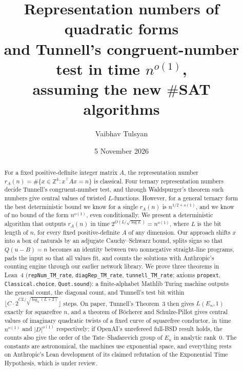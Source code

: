 \documentclass[10pt]{amsart}
\theoremstyle{plain}
\theoremstyle{definition}
\theoremstyle{remark}
\numberwithin{equation}{section}
\begin{document}
\title[Representation numbers and Tunnell's test in time $n^{o(1)}$]{Representation numbers of quadratic forms\\ and Tunnell's congruent-number test in time $n^{o(1)}$,\\ assuming the new $\#$SAT algorithms}

\author{Vaibhav Tulsyan}

\date{5 November 2026}


\begin{abstract}
For a fixed positive-definite integer matrix $A$, the representation number $r_A(n)=\#\{x\in\mathbb{Z}^k : x^{\top}Ax=n\}$ is classical. Four ternary representation numbers decide Tunnell's congruent-number test, and through Waldspurger's theorem such numbers give central values of twisted $L$-functions. However, for a general ternary form the best deterministic bound we know for a single $r_A(n)$ is $n^{1/2+o(1)}$, and we know of no bound of the form $n^{o(1)}$, even conditionally. We present a deterministic algorithm that outputs $r_A(n)$ in time $2^{O(L/\sqrt{\log L})}=n^{o(1)}$, where $L$ is the bit length of $n$, for every fixed positive-definite $A$ of any dimension. Our approach shifts $x$ into a box of naturals by an adjugate Cauchy--Schwarz bound, splits signs so that $Q(u-B)=n$ becomes an identity between two nonnegative straight-line programs, pads the input so that all values fit, and counts the solutions with Anthropic's counting engine through our earlier network library. We prove three theorems in Lean~4 (\texttt{repNum\_TM\_rate}, \texttt{diagRep\_TM\_rate}, \texttt{tunnell\_TM\_rate}; axioms \texttt{propext}, \texttt{Classical.choice}, \texttt{Quot.sound}): a finite-alphabet Mathlib Turing machine outputs the general count, the diagonal count, and Tunnell's test bit within $\lfloor C\cdot 2^{CL/\sqrt{\log_2(L+2)}}\rfloor$ steps. On paper, Tunnell's Theorem~3 then gives $L(E_n,1)$ exactly for squarefree $n$, and a theorem of B\"ocherer and Schulze-Pillot gives central values of imaginary quadratic twists of a fixed curve of squarefree conductor, in time $n^{o(1)}$ and $|D|^{o(1)}$ respectively; if OpenAI's unrefereed full-BSD result holds, the counts also give the order of the Tate--Shafarevich group of $E_n$ in analytic rank~$0$. The constants are astronomical, the machines use exponential space, and everything rests on Anthropic's Lean development of its claimed refutation of the Exponential Time Hypothesis, which is under review.
\end{abstract}
\end{document}
